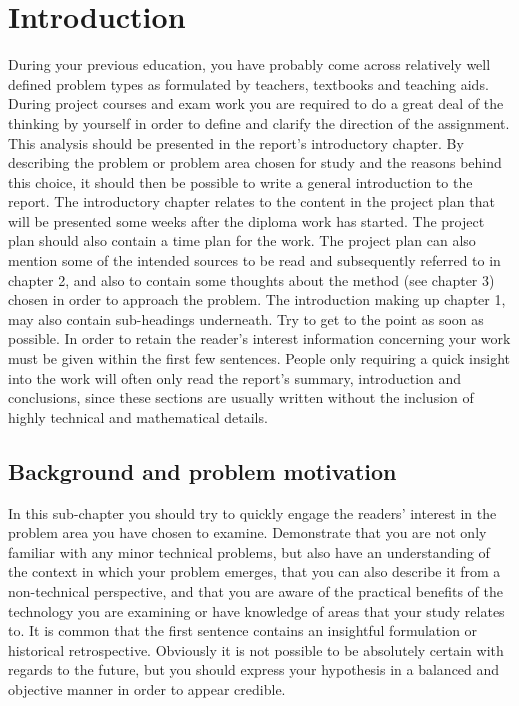 \section{Introduction}\label{sec:intro}
During your previous education, you have probably come across relatively well
defined problem types as formulated by teachers, textbooks and teaching aids.
During project courses and exam work you are required to do a great deal of the
thinking by yourself in order to define and clarify the direction of the
assignment. This analysis should be presented in the report's introductory
chapter. By describing the problem or problem area chosen for study and the
reasons behind this choice, it should then be possible to write a general
introduction to the report. The introductory chapter relates to the content in
the project plan that will be presented some weeks after the diploma work has
started. The project plan should also contain a time plan for the work. The
project plan can also mention some of the intended sources to be read and
subsequently referred to in chapter 2, and also to contain some thoughts about
the method (see chapter 3) chosen in order to approach the problem. The
introduction making up chapter 1, may also contain sub-headings underneath. Try
to get to the point as soon as possible. In order to retain the reader’s
interest information concerning your work must be given within the first few
sentences. People only requiring a quick insight into the work will often only
read the report's summary, introduction and conclusions, since these sections
are usually written without the inclusion of highly technical and mathematical
details.

\subsection{Background and problem motivation}\label{subsec:background}
\noindent 
In this sub-chapter you should try to quickly engage the readers' interest in
the problem area you have chosen to examine. Demonstrate that you are not only
familiar with any minor technical problems, but also have an understanding of
the context in which your problem emerges, that you can also describe it from a
non-technical perspective, and that you are aware of the practical benefits of
the technology you are examining or have knowledge of areas that your study
relates to. It is common that the first sentence contains an insightful
formulation or historical retrospective. Obviously it is not possible to be
absolutely certain with regards to the future, but you should express your
hypothesis in a balanced and objective manner in order to appear credible.

